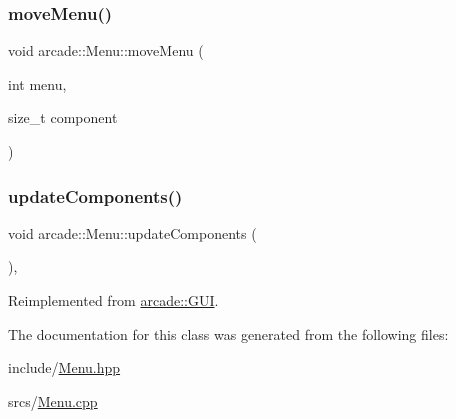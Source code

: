 \subsubsection{\texorpdfstring{move\+Menu()}{moveMenu()}}
{\footnotesize\ttfamily void arcade\+::\+Menu\+::move\+Menu (\begin{DoxyParamCaption}\item[{int}]{menu,  }\item[{size\+\_\+t}]{component }\end{DoxyParamCaption})}

\mbox{\label{classarcade_1_1_menu_a63906aaba91a3be7b0f4f8dcc46e87f4}} 
\subsubsection{\texorpdfstring{update\+Components()}{updateComponents()}}
{\footnotesize\ttfamily void arcade\+::\+Menu\+::update\+Components (\begin{DoxyParamCaption}{ }\end{DoxyParamCaption})\hspace{0.3cm}{\ttfamily [override]}, {\ttfamily [virtual]}}



Reimplemented from \hyperlink{classarcade_1_1_g_u_i_abdf6ff80e7176b8a0e9c4561c5bfbf10}{arcade\+::\+G\+UI}.



The documentation for this class was generated from the following files\+:\begin{DoxyCompactItemize}
\item 
include/\hyperlink{_menu_8hpp}{Menu.\+hpp}\item 
srcs/\hyperlink{_menu_8cpp}{Menu.\+cpp}\end{DoxyCompactItemize}
